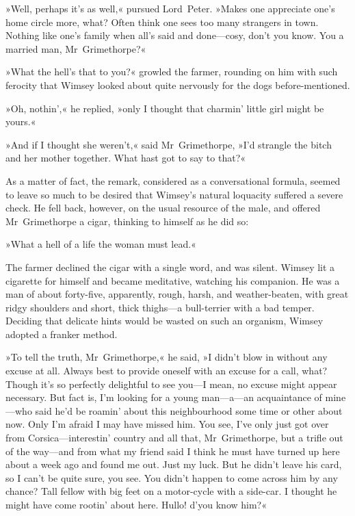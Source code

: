 »Well, perhaps it's as well,« pursued Lord~Peter. »Makes one appreciate one's home circle more, what? Often think one sees too many strangers in town. Nothing like one's family when all's said and done—cosy, don't you know. You a married man, Mr~Grimethorpe?«

»What the hell's that to you?« growled the farmer, rounding on him with such ferocity that Wimsey looked about quite nervously for the dogs before-mentioned.

»Oh, nothin',« he replied, »only I thought that charmin' little girl might be yours.«

»And if I thought she weren't,« said Mr~Grimethorpe, »I'd strangle the bitch and her mother together. What hast got to say to that?«

As a matter of fact, the remark, considered as a conversational formula, seemed to leave so much to be desired that Wimsey's natural loquacity suffered a severe check. He fell back, however, on the usual resource of the male, and offered Mr~Grimethorpe a cigar, thinking to himself as he did so:

»What a hell of a life the woman must lead.«

The farmer declined the cigar with a single word, and was silent.  Wimsey lit a cigarette for himself and became meditative, watching his companion. He was a man of about forty-five, apparently, rough, harsh, and weather-beaten, with great ridgy shoulders and short, thick thighs—a bull-terrier with a bad temper. Deciding that delicate hints would be wasted on such an organism, Wimsey adopted a franker method.

»To tell the truth, Mr~Grimethorpe,« he said, »I didn't blow in without any excuse at all. Always best to provide oneself with an excuse for a call, what? Though it's so perfectly delightful to see you—I mean, no excuse might appear necessary. But fact is, I'm looking for a young man—a—an acquaintance of mine—who said he'd be roamin' about this neighbourhood some time or other about now. Only I'm afraid I may have missed him. You see, I've only just got over from Corsica—interestin' country and all that, Mr~Grimethorpe, but a trifle out of the way—and from what my friend said I think he must have turned up here about a week ago and found me out. Just my luck.  But he didn't leave his card, so I can't be quite sure, you see. You didn't happen to come across him by any chance? Tall fellow with big feet on a motor-cycle with a side-car. I thought he might have come rootin' about here. Hullo! d'you know him?«

